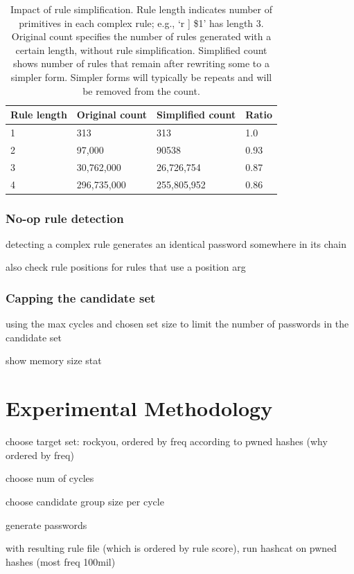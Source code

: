 \documentclass[letterpaper,twocolumn,10pt]{article}
\begin{document}
\begin{table}
\centering
\begin{tabular}{|l|l|l|l|}
\hline
Rule length & Original count & Simplified count & Ratio \\
\hline
1 & 313 & 313 & 1.0 \\
2 & 97,000 & 90538 & 0.93 \\
3 & 30,762,000 & 26,726,754 & 0.87 \\
4 & 296,735,000 & 255,805,952 & 0.86 \\
\hline
\end{tabular}
\caption{Impact of rule simplification. Rule length indicates number of
primitives in each complex rule; e.g., `r ] \$1' has length 3. Original count
specifies the number of rules generated with a certain length, without rule
simplification. Simplified count shows number of rules that remain after
rewriting some to a simpler form. Simpler forms will typically be repeats and
will be removed from the count.}
\end{table}

\subsubsection{No-op rule detection}

detecting a complex rule generates an identical password somewhere in its chain

also check rule positions for rules that use a position arg

\subsubsection{Capping the candidate set}

using the max cycles and chosen set size to limit the number of passwords in
the candidate set

show memory size stat

\section{Experimental Methodology}

choose target set: rockyou, ordered by freq according to pwned hashes (why
ordered by freq)

choose num of cycles

choose candidate group size per cycle

generate passwords

with resulting rule file (which is ordered by rule score), run hashcat on pwned
hashes (most freq 100mil)
\end{document}
